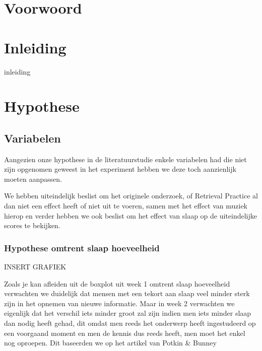 \documentclass{hogent-article}
\affiliation{
  \textsuperscript{1} \href{mailto:wannes.decraene.y0550@student.hogent.be}{mailto:wannes.decraene.y0550@student.hogent.be}
}
\begin{document}
\flushbottom %
\maketitle %
\tableofcontents %
\thispagestyle{empty} %

\section{Voorwoord}

\section{Inleiding}

inleiding




\section{Hypothese}

\subsection{Variabelen}

Aangezien onze hypothese in de literatuurstudie enkele variabelen had die niet zijn opgenomen geweest in het experiment hebben we deze toch aanzienlijk moeten aanpassen.

We hebben uiteindelijk beslist om het originele onderzoek, of Retrieval Practice al dan niet een effect heeft of niet uit te voeren, samen met het effect van muziek hierop en verder hebben we ook beslist om het effect van slaap op de uiteindelijke scores te bekijken.

\subsubsection{Hypothese omtrent slaap hoeveelheid}

INSERT GRAFIEK

Zoals je kan afleiden uit de boxplot uit week 1 omtrent slaap hoeveelheid verwachten we duidelijk dat mensen met een tekort aan slaap veel minder sterk zijn in het opnemen van nieuwe informatie. Maar in week 2 verwachten we eigenlijk dat het verschil iets minder groot zal zijn indien men iets minder slaap dan nodig heeft gehad, dit omdat men reeds het onderwerp heeft ingestudeerd op een voorgaand moment en men de kennis dus reeds heeft, men moet het enkel nog oproepen. Dit baseerden we op het artikel van Potkin \& Bunney
\end{document}
